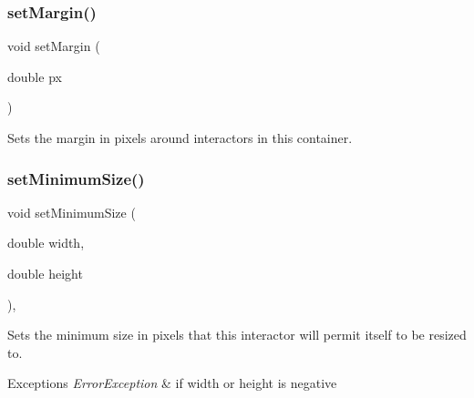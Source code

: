 \mbox{\label{classsgl_1_1GContainer_a79b7a5ffc0a63c8f11be4ed59808f60d}} 
\subsubsection{\texorpdfstring{set\+Margin()}{setMargin()}}
{\footnotesize\ttfamily void set\+Margin (\begin{DoxyParamCaption}\item[{double}]{px }\end{DoxyParamCaption})\hspace{0.3cm}{\ttfamily [virtual]}}



Sets the margin in pixels around interactors in this container. 

\mbox{\label{classsgl_1_1GInteractor_a0cf428e207b7f22cc08138a90b1b87b2}} 
\subsubsection{\texorpdfstring{set\+Minimum\+Size()}{setMinimumSize()}\hspace{0.1cm}{\footnotesize\ttfamily [1/2]}}
{\footnotesize\ttfamily void set\+Minimum\+Size (\begin{DoxyParamCaption}\item[{double}]{width,  }\item[{double}]{height }\end{DoxyParamCaption})\hspace{0.3cm}{\ttfamily [virtual]}, {\ttfamily [inherited]}}



Sets the minimum size in pixels that this interactor will permit itself to be resized to. 


\begin{DoxyExceptions}{Exceptions}
{\em Error\+Exception} & if width or height is negative \\
\hline
\end{DoxyExceptions}
\mbox{\label{classsgl_1_1GInteractor_a3b1046117ac6cb7abe467e00ba8a81f4}} 
